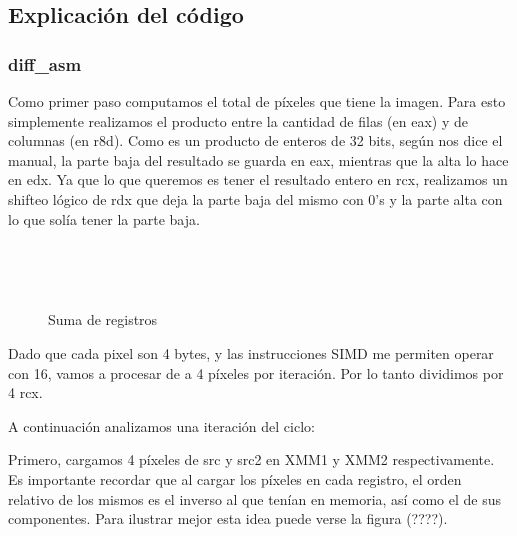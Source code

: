 \subsection{Explicación del código}
\subsubsection*{diff\_asm}
Como primer paso computamos el total de píxeles que tiene la imagen. Para esto simplemente realizamos el producto entre la cantidad de filas (en eax) y de columnas (en r8d). Como es un producto de enteros de 32 bits, según nos dice el manual, la parte baja del resultado se guarda en eax, mientras que la alta lo hace en edx. Ya que lo que queremos es tener el resultado entero en rcx, realizamos un shifteo lógico de rdx que deja la parte baja del mismo con 0's y la parte alta con lo que solía tener la parte baja. 

\begin{figure}[h]
\caption{Suma de registros}
\label{fig:sumaReg}
	\begin{bytefield}[bitwidth = 0.75em]{64}
		\\
	\end{bytefield}

	\vspace*{5em}
	\begin{bytefield}[bitwidth = 0.75em]{64}
		\\
	\end{bytefield}
\end{figure}

Dado que cada pixel son 4 bytes, y las instrucciones SIMD me permiten operar con 16, vamos a procesar de a 4 píxeles por iteración. Por lo tanto dividimos por 4 rcx.

A continuación analizamos una iteración del ciclo:

Primero, cargamos 4 píxeles de src y src2 en XMM1 y XMM2 respectivamente. Es importante recordar que al cargar los píxeles en cada registro, el orden relativo de los mismos es el inverso al que tenían en memoria, así como el de sus componentes. Para ilustrar mejor esta idea puede verse la figura (????). 

